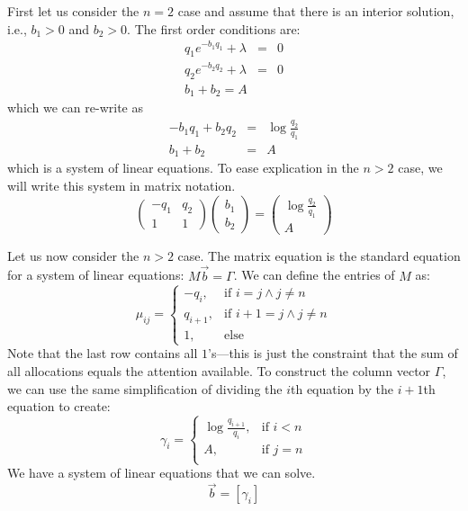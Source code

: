 First let us consider the $n=2$ case and assume that there is an
interior solution, i.e., $b_1 > 0$ and $b_2 > 0$. The first order
conditions are:
\begin{eqnarray}
q_1 e^{-b_1q_1} + \lambda &=& 0 \nonumber\\
q_2 e^{-b_2q_2} + \lambda &=& 0 \nonumber\\
b_1 + b_2 = A 
\end{eqnarray} 
which we can re-write as 
\begin{eqnarray}
-b_1q_1 + b_2q_2  &=& \log \frac{q_2}{q_1} \nonumber\\
b_1 + b_2 & = & A 
\end{eqnarray} 
which is a system of linear equations. To ease explication in the $n >
2$ case, we will write this system in matrix notation. 
\begin{equation}
\left( \begin{array}{cc}
-q_1 & q_2  \\
1 & 1  \end{array} \right) 
\left( \begin{array}{c}
b_1   \\
b_2    \end{array} \right)
=
\left( \begin{array}{c}
\log \frac{q_2}{q_1}   \\
A    \end{array} \right)
\end{equation} 

Let us now consider the $n > 2$ case. The matrix equation is the
standard equation for a system of linear equations: $M \vec{b} =
\Gamma$. We can define the entries of $M$ as:  
\begin{equation}
\mu_{ij} =
\begin{cases}
-q_i, & \text{if }i = j \wedge j \ne n \\
q_{i+1}, & \text{if }i + 1 = j \wedge j \ne n \\ 
1, & \text{else} 
\end{cases}
\end{equation}
Note that the last row contains all $1$'s---this is just the
constraint that the sum of all allocations equals the attention
available. To construct the column vector $\Gamma$, we can use the
same simplification of dividing the $i$th equation by the $i + 1$th
equation to create:
\begin{equation}
\gamma_{i} = 
\begin{cases}
\log \frac{q_{i+1}}{q_{i}}, & \text{if }i < n \\
A, & \text{if }j = n \\ 
\end{cases}
\end{equation}
We have a system of linear equations that we can solve.  
\begin{equation} 
[ m_{ij} ] \vec{b} = [ \gamma_i ]
\end{equation} 

